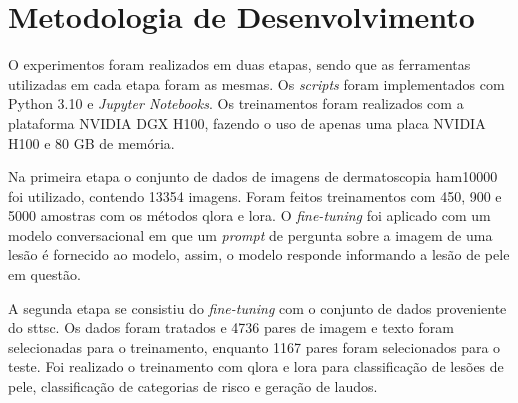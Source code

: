\section{Metodologia de Desenvolvimento}

O experimentos foram realizados em duas etapas, sendo que as ferramentas utilizadas em cada etapa foram as mesmas. Os
\textit{scripts} foram implementados com Python 3.10 e \textit{Jupyter Notebooks}. Os treinamentos foram realizados com
a plataforma NVIDIA DGX H100, fazendo o uso de apenas uma placa NVIDIA H100 e 80 GB de memória.

Na primeira etapa o conjunto de dados de imagens de dermatoscopia \ac{ham10000} foi utilizado, contendo 13354 imagens.
Foram feitos treinamentos com 450, 900 e 5000 amostras com os métodos \ac{qlora} e \ac{lora}. O \textit{fine-tuning}
foi aplicado com um modelo conversacional em que um \textit{prompt} de pergunta sobre a imagem de uma lesão é fornecido
ao modelo, assim, o modelo responde informando a lesão de pele em questão.

A segunda etapa se consistiu do \textit{fine-tuning} com o conjunto de dados proveniente do \ac{sttsc}. Os dados foram
tratados e 4736 pares de imagem e texto foram selecionadas para o treinamento, enquanto 1167 pares foram selecionados
para o teste. Foi realizado o treinamento com \ac{qlora} e \ac{lora} para classificação de lesões de pele,
classificação de categorias de risco e geração de laudos.
